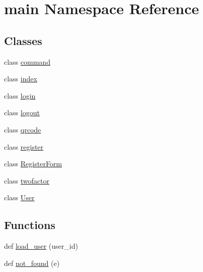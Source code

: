 \hypertarget{namespacemain}{}\section{main Namespace Reference}
\label{namespacemain}
\subsection*{Classes}
\begin{DoxyCompactItemize}
\item 
class \hyperlink{classmain_1_1command}{command}
\item 
class \hyperlink{classmain_1_1index}{index}
\item 
class \hyperlink{classmain_1_1login}{login}
\item 
class \hyperlink{classmain_1_1logout}{logout}
\item 
class \hyperlink{classmain_1_1qrcode}{qrcode}
\item 
class \hyperlink{classmain_1_1register}{register}
\item 
class \hyperlink{classmain_1_1RegisterForm}{Register\+Form}
\item 
class \hyperlink{classmain_1_1twofactor}{twofactor}
\item 
class \hyperlink{classmain_1_1User}{User}
\end{DoxyCompactItemize}
\subsection*{Functions}
\begin{DoxyCompactItemize}
\item 
def \hyperlink{namespacemain_a64310d76bee3c7581aaa85925bf1bb53}{load\+\_\+user} (user\+\_\+id)
\item 
def \hyperlink{namespacemain_a0803c7dc3e1c168a3fbcf5b054109aa1}{not\+\_\+found} (e)
\end{DoxyCompactItemize}
